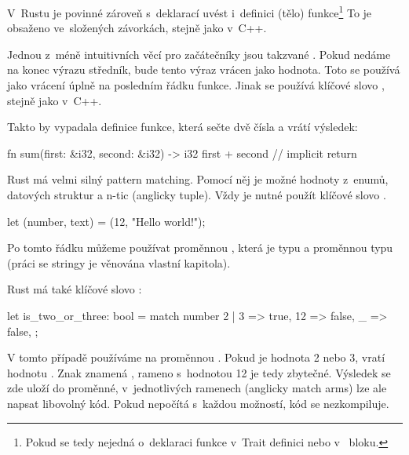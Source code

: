 \documentclass[main.tex]{subfiles}
\begin{document}
V~Rustu je povinné zároveň s~deklarací uvést i~definici (tělo) funkce\footnote{Pokud
    se tedy nejedná o~deklaraci funkce v~Trait definici nebo v~ bloku.
} To je obsaženo ve~složených závorkách, stejně jako v~C++.

Jednou z~méně intuitivních věcí pro začátečníky jsou takzvané .
Pokud nedáme na konec výrazu středník, bude tento výraz vrácen jako hodnota. Toto se
používá jako vrácení úplně na posledním řádku funkce. Jinak se používá klíčové slovo
, stejně jako v~C++. \cite[sekce 3.3]{thebook}

Takto by vypadala definice funkce, která sečte dvě čísla a vrátí výsledek:

\obrazek
\begin{rustcode}
    fn sum(first: &i32, second: &i32) -> i32 {
        first + second // implicit return
    }
\end{rustcode}


Rust má velmi silný pattern matching. Pomocí něj je možné  hodnoty
z~enumů, datových struktur a n-tic (anglicky tuple). Vždy je nutné použít klíčové
slovo .

\obrazek
\begin{rustcode}
    let (number, text) = (12, "Hello world!");
\end{rustcode}

Po tomto řádku můžeme používat proměnnou , která je typu  a
proměnnou  typu  (práci se stringy je věnována vlastní kapitola).
\cite[sekce 18.1]{thebook}

Rust má také klíčové slovo :

\obrazek
\begin{rustcode}
    let is_two_or_three: bool = match number {
        2 | 3 => true,
        12 => false,
        _ => false,
    };
\end{rustcode}

V tomto případě používáme  na proměnnou . Pokud je hodnota
2 nebo 3, vratí  hodnotu . Znak \irust{_} znamená
, rameno s~hodnotou 12 je tedy zbytečné. Výsledek se zde uloží do
proměnné, v~jednotlivých ramenech (anglicky match arms) lze ale napsat libovolný kód.
Pokud  nepočítá s~každou možností, kód se nezkompiluje.
\cite[sekce 8.2.16]{reference}
\end{document}
